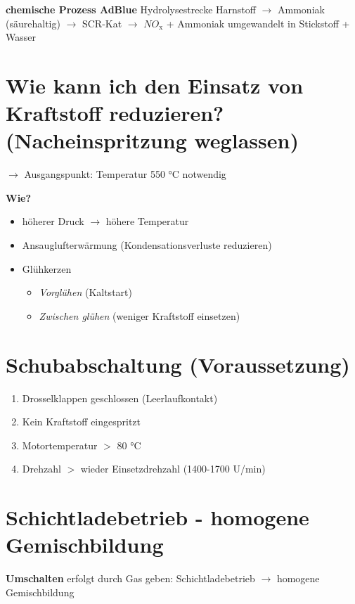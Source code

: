 \textbf{chemische Prozess AdBlue} Hydrolysestrecke Harnstoff $\to$
Ammoniak (säurehaltig) $\to$ SCR-Kat $\to$ $NO_\text{x}$ +
Ammoniak umgewandelt in Stickstoff + Wasser

\section{Wie kann ich den Einsatz von Kraftstoff reduzieren?
(Nacheinspritzung
weglassen)}\label{wie-kann-ich-den-einsatz-von-kraftstoff-reduzieren-nacheinspritzung-weglassen}

$\to$ Ausgangspunkt: Temperatur 550 °C notwendig

\textbf{Wie?}

\begin{itemize}
\item
  höherer Druck $\to$ höhere Temperatur
\item
  Ansauglufterwärmung (Kondensationsverluste reduzieren)
\item
  Glühkerzen

  \begin{itemize}
  \item
    \emph{Vorglühen} (Kaltstart)
  \item
    \emph{Zwischen glühen} (weniger Kraftstoff einsetzen)
  \end{itemize}
\end{itemize}

\section{Schubabschaltung
(Voraussetzung)}\label{schubabschaltung-voraussetzung}

\begin{enumerate}
\item
  Drosselklappen geschlossen (Leerlaufkontakt)
\item
  Kein Kraftstoff eingespritzt
\item
  Motortemperatur $>$ 80 °C
\item
  Drehzahl $>$ wieder Einsetzdrehzahl (1400-1700 U/min)
\end{enumerate}

\section{Schichtladebetrieb - homogene
Gemischbildung}\label{schichtladebetrieb-homogene-gemischbildung}

\textbf{Umschalten} erfolgt durch Gas geben: Schichtladebetrieb $\to$
homogene Gemischbildung

